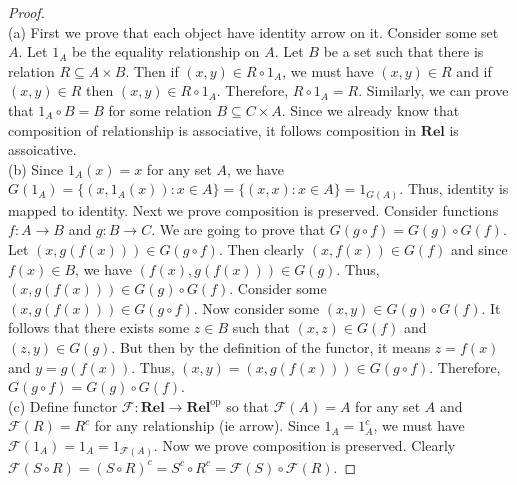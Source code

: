 \documentclass[a4paper, 11pt]{book}
\theoremstyle{plain}
\theoremstyle{plain}
\newcommand{\mb}{\mathbf}
\newcommand{\arr}{\rightarrow}
\newcommand{\op}{\text{op}}
\newcommand{\mc}{\mathcal}
\newcommand{\F}{\mc{F}}
\begin{document}
  \begin{proof} $ $ \\
    (a) First we prove that each object have identity arrow on it. Consider some set $A$. Let $1_A$ be the equality relationship on $A$. Let $B$ be a set such that there is relation $R \subseteq A \times B$. Then if $(x,y) \in R \circ 1_A$, we must have $(x,y) \in R$ and if $(x,y) \in R$ then $(x,y) \in R \circ 1_A$. Therefore, $R \circ 1_A=R$. Similarly, we can prove that $1_A \circ B=B$ for some relation $B \subseteq C \times A$. Since we already know that composition of relationship is associative, it follows composition in $\mb{Rel}$ is assoicative. \\

    (b) Since $1_A(x)=x$ for any set $A$, we have $G(1_A)=\{(x, 1_A(x)): x \in A\}=\{(x,x):x \in A\}=1_{G(A)}$. Thus, identity is mapped to identity. Next we prove composition is preserved. Consider functions $f:A \arr B$ and $g:B \arr C$. We are going to prove that $G(g \circ f)=G(g) \circ G(f)$. Let $(x, g(f(x))) \in G(g \circ f)$. Then clearly $(x, f(x)) \in G(f)$ and since $f(x) \in B$, we have $(f(x), g(f(x))) \in G(g)$. Thus, $(x, g(f(x))) \in G(g) \circ G(f)$. Consider some $(x,g(f(x))) \in G(g \circ f)$. Now consider some $(x,y) \in G(g) \circ G(f)$. It follows that there exists some $z \in B$ such that $(x,z) \in G(f)$ and $(z,y) \in G(g)$. But then by the definition of the functor, it means $z=f(x)$ and $y=g(f(x))$. Thus, $(x,y)=(x,g(f(x))) \in G(g \circ f)$. Therefore, $G(g \circ f)=G(g) \circ G(f)$. \\

    (c) Define functor $\mc{F}: \mb{Rel} \arr \mb{Rel}^\op$ so that $\mc{F}(A)=A$ for any set $A$ and $\mc{F}(R)=R^c$ for any relationship (ie arrow). Since $1_A=1_A^c$, we must have $\mc{F}(1_A)=1_A=1_{\mc{F}(A)}$. Now we prove composition is preserved. Clearly $\mc{F}(S \circ R)=(S \circ R)^c = S^c \circ R^c = \F(S) \circ \F(R)$.
  \end{proof}
\end{document}
